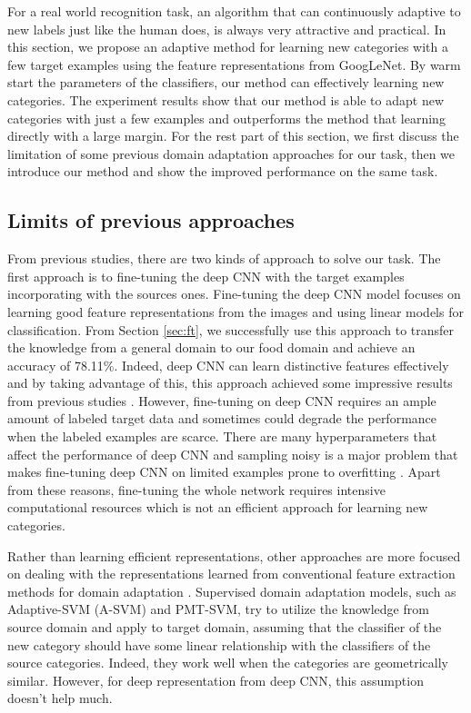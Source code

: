 ﻿For a real world recognition task, an algorithm that can continuously adaptive to new labels just like the human does, is always very attractive and practical.
In this section, we propose an adaptive method for learning new categories with a few target examples using the feature representations from GoogLeNet. By warm start the parameters of the classifiers, our method can effectively learning new categories. The experiment results show that our method is able to adapt new categories with just a few examples and outperforms the method that learning directly with a large margin.
For the rest part of this section, we first discuss the limitation of some previous domain adaptation approaches for our task, then we introduce our method and show the improved performance on the same task.

\subsection{Limits of previous approaches}
From previous studies, there are two kinds of approach to solve our task. The first approach is to fine-tuning the deep CNN with the target examples incorporating with the sources ones.
Fine-tuning the deep CNN model focuses on learning good feature representations from the images and using linear models for classification. From Section \ref{sec:ft}, we successfully use this approach to transfer the knowledge from a general domain to our food domain and achieve an accuracy of 78.11\%. Indeed, deep CNN can learn distinctive features effectively and by taking advantage of this, this approach achieved some impressive results from previous studies\cite{Chatfield14} \cite{zeiler2014visualizing}. However, fine-tuning on deep CNN requires an ample amount of labeled target data and sometimes could degrade the performance when the labeled examples are scarce\cite{hoffman2013one}. There are many hyperparameters that affect the performance of deep CNN and sampling noisy is a major problem that makes fine-tuning deep CNN on limited examples prone to overfitting \cite{srivastava2014dropout}. Apart from these reasons, fine-tuning the whole network requires intensive computational resources which is not an efficient approach for learning new categories.

Rather than learning efficient representations, other approaches are more focused on dealing with the representations learned from conventional feature extraction methods for domain adaptation \cite{yang2007adapting} \cite{aytar2011tabula}. Supervised domain adaptation models, such as Adaptive-SVM (A-SVM) and PMT-SVM, try to utilize the knowledge from source domain and apply to target domain, assuming that the classifier of the new category should have some linear relationship with the classifiers of the source categories. Indeed, they work well when the categories are geometrically similar. However, for deep representation from deep CNN, this assumption doesn't help much.

